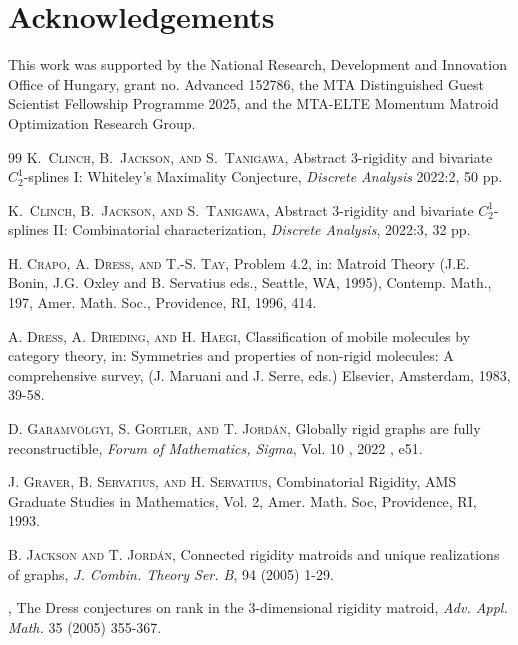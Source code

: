 \documentclass[11pt,a4paper]{article}
\theoremstyle{definition}
\begin{document}
    
\section*{Acknowledgements}


This work was supported by the National Research, Development and Innovation Office
of Hungary, grant no. Advanced 152786, the MTA Distinguished Guest Scientist Fellowship Programme 2025,
and the MTA-ELTE Momentum Matroid Optimization Research Group.



\begin{thebibliography}{99}
    {\scshape K.\ Clinch, B.\ Jackson, and S.\ Tanigawa}, Abstract 3-rigidity and bivariate $C_2^1$-splines I: Whiteley’s Maximality Conjecture,  {\it Discrete Analysis} 2022:2, 50 pp.
    
    
    {\scshape K.\ Clinch, B.\ Jackson, and S.\ Tanigawa}, Abstract 3-rigidity and bivariate $C_2^1$-splines II: Combinatorial characterization, {\it Discrete Analysis}, 2022:3, 32 pp.
    
     {\scshape H. Crapo, A. Dress, and T.-S. Tay},
    \newblock Problem 4.2, in:
    \newblock Matroid Theory (J.E. Bonin, J.G. Oxley and B. Servatius eds.,
    Seattle, WA, 1995),
    Contemp. Math., 197, Amer. Math. Soc., Providence, RI, 1996, 414.
    
    
     {\scshape A. Dress, A. Drieding, and H. Haegi},
    Classification of mobile molecules by category theory,
    in: Symmetries and properties of non-rigid molecules: A
    comprehensive survey, (J. Maruani and J. Serre, eds.)
    Elsevier, Amsterdam, 1983, 39-58.
    
     {\scshape D. Garamv\"olgyi, S. Gortler, and T. Jord\'an}, 
    Globally rigid graphs are fully reconstructible,
    {\it Forum of Mathematics, Sigma}, Vol. 10 , 2022 , e51.
    
     {\scshape J. Graver, B. Servatius, and H. Servatius},
    \newblock Combinatorial Rigidity,
    \newblock AMS Graduate Studies in
    Mathematics, Vol. 2, Amer. Math. Soc, Providence, RI, 1993.

 {\scshape B. Jackson and T. Jord\'an,}
\newblock Connected rigidity matroids and unique
realizations of graphs, 
{\it J. Combin. Theory Ser. B},  94 (2005)  1-29.

,
The Dress conjectures on rank in the 3-dimensional rigidity matroid,
{\it Adv. Appl. Math.} 35 (2005) 355-367.
    

\end{thebibliography}
\end{document}
